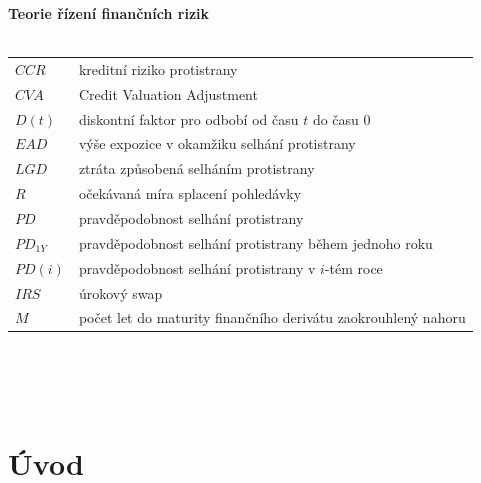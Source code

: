 \documentclass[a4paper,12pt]{report}
\theoremstyle{definition} \newtheorem{definice}[veta]{Definice}
\theoremstyle{remark}
\begin{document}
%
%
%
\newpage \noindent
\textbf{Teorie řízení finančních rizik}\\\\
   \begin{tabular}{p{4cm} p{9.3cm}}
   $CCR$ 								& kreditní riziko protistrany\\
   $CVA$								& Credit Valuation Adjustment\\
   $D(t)$								& diskontní faktor pro odbobí od času $t$ do času 0\\
   $EAD$								& výše expozice v okamžiku selhání protistrany\\
   $LGD$								& ztráta způsobená selháním protistrany\\
   $R$									& očekávaná míra splacení pohledávky\\
   $PD$								& pravděpodobnost selhání protistrany\\
   $PD_{1Y}$								& pravděpodobnost selhání protistrany během jednoho roku\\
   $PD(i)$								& pravděpodobnost selhání protistrany v $i$-tém roce\\
   $IRS$								& úrokový swap\\
   $M$									& počet let do maturity finančního derivátu zaokrouhlený nahoru\\
\end{tabular}\\\\\\
%
%
%

\chapter*{Úvod} 
\pagestyle{plain}
\setcounter{page}{1}





\end{document}
